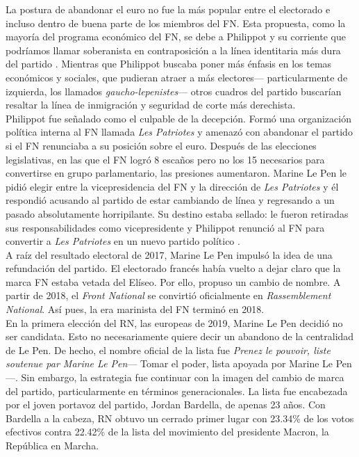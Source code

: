 La postura de abandonar el euro no fue la más popular entre el electorado e incluso dentro de buena parte de los miembros del FN. Esta propuesta, como la mayoría del programa económico del FN, se debe a Philippot y su corriente que podríamos llamar soberanista en contraposición a la línea identitaria más dura del partido \parencites{Marin17}{Berteloot17}{Europe17}. Mientras que Philippot buscaba poner más énfasis en los temas económicos y sociales, que pudieran atraer a más electores--- particularmente de izquierda, los llamados \textit{gaucho-lepenistes}--- otros cuadros del partido buscarían resaltar la línea de inmigración y seguridad de corte más derechista.\\ 

Philippot fue señalado como el culpable de la decepción. Formó una organización política interna al FN llamada \textit{Les Patriotes} y amenazó con abandonar el partido si el FN renunciaba a su posición sobre el euro. Después de las elecciones legislativas, en las que el FN logró 8 escaños pero no los 15 necesarios para convertirse en grupo parlamentario, las presiones aumentaron. Marine Le Pen le pidió elegir entre la vicepresidencia del FN y la dirección de \textit{Les Patriotes} y él respondió acusando al partido de estar cambiando de línea y regresando a un pasado absolutamente horripilante. Su destino estaba sellado: le fueron retiradas sus responsabilidades como vicepresidente y Philippot renunció al FN para convertir a \textit{Les Patriotes} en un nuevo partido político \parencites{Galtier17}{Zafimehy17}.\\

A raíz del resultado electoral de 2017, Marine Le Pen impulsó la idea de una refundación del partido. El electorado francés había vuelto a dejar claro que la marca FN estaba vetada del Elíseo. Por ello, propuso un cambio de nombre. A partir de 2018, el \textit{Front National} se convirtió oficialmente en \textit{Rassemblement National}. Así pues, la era marinista del FN terminó en 2018.\\ 

En la primera elección del RN, las europeas de 2019, Marine Le Pen decidió no ser candidata. Esto no necesariamente quiere decir un abandono de la centralidad de Le Pen. De hecho, el nombre oficial de la lista fue \textit{Prenez le pouvoir, liste soutenue par Marine Le Pen}--- Tomar el poder, lista apoyada por Marine Le Pen---. Sin embargo, la estrategia fue continuar con la imagen del cambio de marca del partido, particularmente en términos generacionales. La lista fue encabezada por el joven portavoz del partido, Jordan Bardella, de apenas 23 años. Con Bardella a la cabeza, RN obtuvo un cerrado primer lugar con 23.34\% de los votos efectivos contra 22.42\% de la lista del movimiento del presidente Macron, la República en Marcha.\\ 

